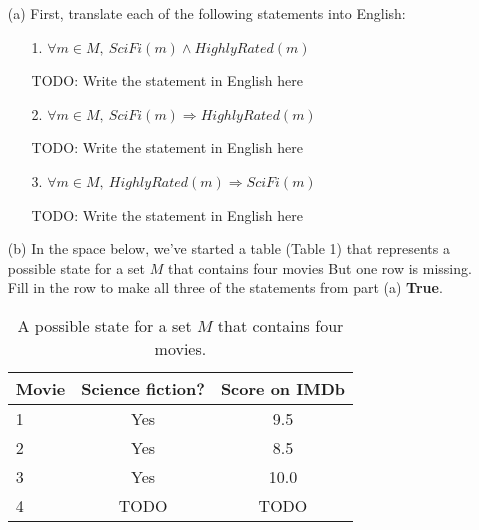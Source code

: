 \documentclass{article}
\begin{document}
\begin{enumerate}
\item[(a)]
First, translate each of the following statements into English:

\begin{enumerate}
\item[1.]
$\forall m \in M,~ SciFi(m) \land HighlyRated(m)$

\begin{framed}
TODO: Write the statement in English here
\end{framed}

\item[2.]
$\forall m \in M,~ SciFi(m) \Rightarrow HighlyRated(m)$

\begin{framed}
TODO: Write the statement in English here
\end{framed}

\item[3.] $\forall m \in M,~ HighlyRated(m) \Rightarrow SciFi(m)$

\begin{framed}
TODO: Write the statement in English here
\end{framed}

\end{enumerate}

\item[(b)]
In the space below, we've started a table (Table 1) that represents a possible state for a set $M$ that contains four movies
But one row is missing.
Fill in the row to make all three of the statements from part (a) \textbf{True}.

\begin{table}[h!]
\centering
\caption{A possible state for a set $M$ that contains four movies.}
\begin{tabular}{|l|c|c|}
\hline
\textbf{Movie} & \textbf{Science fiction?} & \textbf{Score on IMDb} \\
\hline
1 & Yes & 9.5 \\
\hline
2 & Yes & 8.5 \\
\hline
3 & Yes & 10.0 \\
\hline
4 & TODO & TODO \\ %
\hline
\end{tabular}
\end{table}

\end{enumerate}
\end{document}
